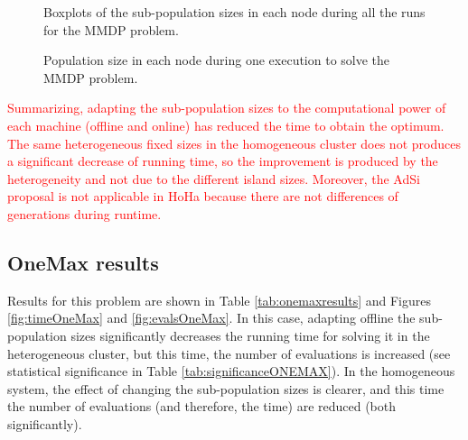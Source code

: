 \documentclass[final,1p,times]{elsarticle}
\begin{document}
\begin{figure}[htb]
\centering
{}
\caption{Boxplots of the sub-population sizes in each node during all the runs for the MMDP problem.}
\label{fig:sizesMMDP}
\end{figure}

\begin{figure}[htb]
\centering
{}
\caption{Population size in each node during one execution to solve the MMDP problem.}
\label{fig:sizesMMDP1ejec}
\end{figure}

\begin{table}
\end{table}


\textcolor{red}{Summarizing, adapting the sub-population sizes to the computational power of each machine (offline and online) has reduced the time to obtain the optimum. The same heterogeneous fixed sizes in the homogeneous cluster does not produces a significant decrease of running time, so the improvement is produced by the heterogeneity and not due to the different island sizes. Moreover, the AdSi proposal is not applicable in HoHa because there are not differences of generations during runtime.}


\subsection{OneMax results}

Results for this problem are shown in Table \ref{tab:onemaxresults} and Figures  \ref{fig:timeOneMax} and \ref{fig:evalsOneMax}. In this case, adapting offline the sub-population sizes significantly decreases  the running time for solving it in the heterogeneous cluster, but this time, the number of evaluations is increased (see statistical significance in Table \ref{tab:significanceONEMAX}). In the homogeneous system, the effect of changing the sub-population sizes is clearer, and this time the number of evaluations (and therefore, the time) are reduced (both significantly). 
\end{document}
